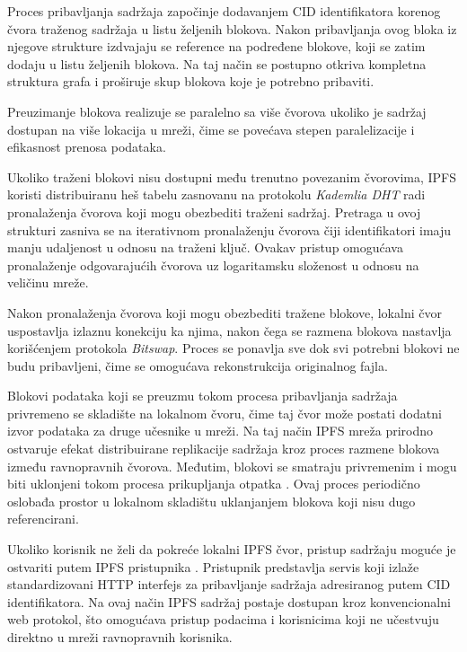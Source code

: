 Proces pribavljanja sadržaja započinje dodavanjem CID identifikatora korenog čvora traženog sadržaja u listu željenih blokova. Nakon pribavljanja ovog bloka iz njegove strukture izdvajaju se reference na podređene blokove, koji se zatim dodaju u listu željenih blokova. Na taj način se postupno otkriva kompletna struktura grafa i proširuje skup blokova koje je potrebno pribaviti.

Preuzimanje blokova realizuje se paralelno sa više čvorova ukoliko je sadržaj dostupan na više lokacija u mreži, čime se povećava stepen paralelizacije i efikasnost prenosa podataka.

Ukoliko traženi blokovi nisu dostupni među trenutno povezanim čvorovima, IPFS koristi distribuiranu heš tabelu zasnovanu na protokolu \textit{Kademlia DHT} \cite{maymounkov2002kademlia} radi pronalaženja čvorova koji mogu obezbediti traženi sadržaj. Pretraga u ovoj strukturi zasniva se na iterativnom pronalaženju čvorova čiji identifikatori imaju manju udaljenost u odnosu na traženi ključ. Ovakav pristup omogućava pronalaženje odgovarajućih čvorova uz logaritamsku složenost u odnosu na veličinu mreže.

Nakon pronalaženja čvorova koji mogu obezbediti tražene blokove, lokalni čvor uspostavlja izlaznu konekciju ka njima, nakon čega se razmena blokova nastavlja korišćenjem protokola \textit{Bitswap}. Proces se ponavlja sve dok svi potrebni blokovi ne budu pribavljeni, čime se omogućava rekonstrukcija originalnog fajla.

Blokovi podataka koji se preuzmu tokom procesa pribavljanja sadržaja privremeno se skladište na lokalnom čvoru, čime taj čvor može postati dodatni izvor podataka za druge učesnike u mreži. Na taj način IPFS mreža prirodno ostvaruje efekat distribuirane replikacije sadržaja kroz proces razmene blokova između ravnopravnih čvorova. Međutim, blokovi se smatraju privremenim i mogu biti uklonjeni tokom procesa prikupljanja otpatka . Ovaj proces periodično oslobađa prostor u lokalnom skladištu uklanjanjem blokova koji nisu dugo referencirani.

Ukoliko korisnik ne želi da pokreće lokalni IPFS čvor, pristup sadržaju moguće je ostvariti putem IPFS pristupnika . Pristupnik predstavlja servis koji izlaže standardizovani HTTP interfejs za pribavljanje sadržaja adresiranog putem CID identifikatora. Na ovaj način IPFS sadržaj postaje dostupan kroz konvencionalni web protokol, što omogućava pristup podacima i korisnicima koji ne učestvuju direktno u mreži ravnopravnih korisnika.

